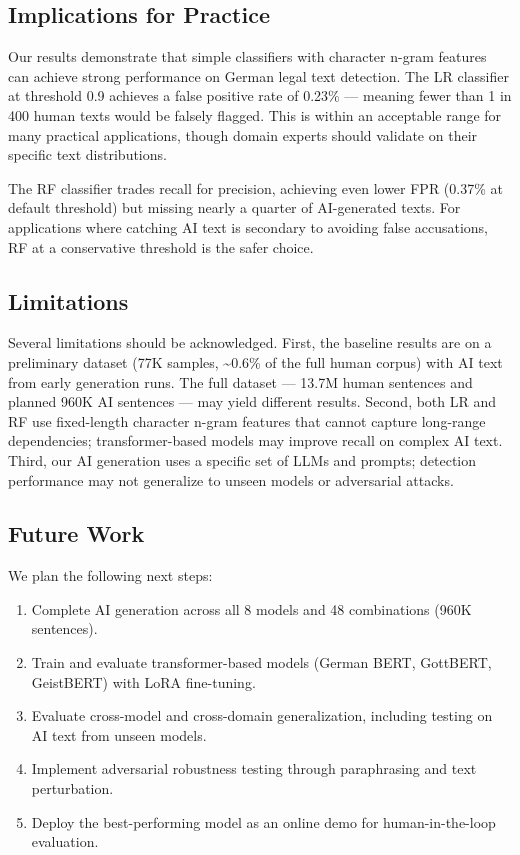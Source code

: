 \documentclass[11pt,a4paper]{article}
\begin{document}
\subsection{Implications for Practice}

Our results demonstrate that simple classifiers with character n-gram features can achieve strong performance on German legal text detection. The LR classifier at threshold 0.9 achieves a false positive rate of 0.23\% --- meaning fewer than 1 in 400 human texts would be falsely flagged. This is within an acceptable range for many practical applications, though domain experts should validate on their specific text distributions.

The RF classifier trades recall for precision, achieving even lower FPR (0.37\% at default threshold) but missing nearly a quarter of AI-generated texts. For applications where catching AI text is secondary to avoiding false accusations, RF at a conservative threshold is the safer choice.

\subsection{Limitations}

Several limitations should be acknowledged. First, the baseline results are on a preliminary dataset (77K samples, \textasciitilde0.6\% of the full human corpus) with AI text from early generation runs. The full dataset --- 13.7M human sentences and planned 960K AI sentences --- may yield different results. Second, both LR and RF use fixed-length character n-gram features that cannot capture long-range dependencies; transformer-based models may improve recall on complex AI text. Third, our AI generation uses a specific set of LLMs and prompts; detection performance may not generalize to unseen models or adversarial attacks.

\subsection{Future Work}

We plan the following next steps:
\begin{enumerate}
  \item Complete AI generation across all 8 models and 48 combinations (960K sentences).
  \item Train and evaluate transformer-based models (German BERT, GottBERT, GeistBERT) with LoRA fine-tuning.
  \item Evaluate cross-model and cross-domain generalization, including testing on AI text from unseen models.
  \item Implement adversarial robustness testing through paraphrasing and text perturbation.
  \item Deploy the best-performing model as an online demo for human-in-the-loop evaluation.
\end{enumerate}
\end{document}
